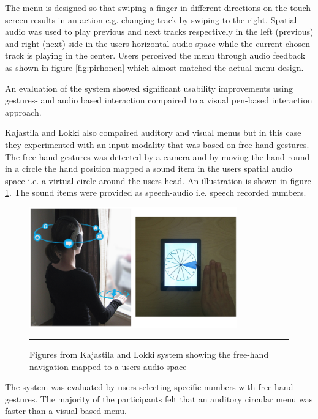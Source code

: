 The menu is designed so that swiping a finger in different directions on the touch screen results in an action e.g. changing track by swiping to the right. Spatial audio was used to play previous and next tracks respectively in the left (previous) and right (next) side in the users horizontal audio space while the current chosen track is playing in the center. Users perceived the menu through audio feedback as shown in figure \ref{fig:pirhonen} which almost matched the actual menu design.

An evaluation of the system showed significant usability improvements using gestures- and audio based interaction compaired to a visual pen-based interaction approach.


Kajastila and Lokki \cite{kajastila_interaction_2013} also compaired auditory and visual menus but in this case they experimented with an input modality that was based on free-hand gestures. The free-hand gestures was detected by a camera and by moving the hand round in a circle the hand position mapped a sound item in the users spatial audio space i.e. a virtual circle around the users head. An illustration is shown in figure \ref{fig:kajastila}. The sound items were provided as speech-audio i.e. speech recorded numbers.

\begin{figure}[htbp]
	\centering
		\includegraphics[width=0.8\textwidth,height=\textheight,keepaspectratio]{./Figures/kajastila-system.png}
		\rule{35em}{0.5pt}
	\caption[Pirhonen system]{Figures from Kajastila and Lokki \cite{kajastila_interaction_2013} system showing the free-hand navigation mapped to a users audio space}
	\label{fig:kajastila}
\end{figure}

The system was evaluated by users selecting specific numbers with free-hand gestures. The majority of the participants felt that an auditory circular menu was faster than a visual based menu.


